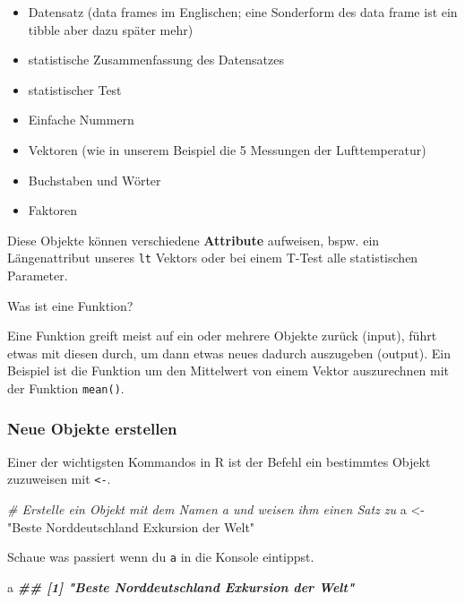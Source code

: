 \documentclass[
]{article}
\newenvironment{Shaded}{\begin{snugshade}}{\end{snugshade}}
\newcommand{\CommentTok}[1]{\textcolor[rgb]{0.56,0.35,0.01}{\textit{#1}}}
\newcommand{\DocumentationTok}[1]{\textcolor[rgb]{0.56,0.35,0.01}{\textbf{\textit{#1}}}}
\newcommand{\NormalTok}[1]{#1}
\newcommand{\OtherTok}[1]{\textcolor[rgb]{0.56,0.35,0.01}{#1}}
\newcommand{\StringTok}[1]{\textcolor[rgb]{0.31,0.60,0.02}{#1}}
\providecommand{\tightlist}{%
  \setlength{\itemsep}{0pt}\setlength{\parskip}{0pt}}
\begin{document}
\begin{itemize}
\tightlist
\item
  Datensatz (data frames im Englischen; eine Sonderform des data frame ist ein tibble aber dazu später mehr)
\item
  statistische Zusammenfassung des Datensatzes
\item
  statistischer Test
\item
  Einfache Nummern
\item
  Vektoren (wie in unserem Beispiel die 5 Messungen der Lufttemperatur)
\item
  Buchstaben und Wörter
\item
  Faktoren
\end{itemize}

Diese Objekte können verschiedene \textbf{Attribute} aufweisen, bspw. ein Längenattribut unseres \texttt{lt} Vektors oder bei einem T-Test alle statistischen Parameter.

Was ist eine Funktion?

Eine Funktion greift meist auf ein oder mehrere Objekte zurück (input), führt etwas mit diesen durch, um dann etwas neues dadurch auszugeben (output). Ein Beispiel ist die Funktion um den Mittelwert von einem Vektor auszurechnen mit der Funktion \texttt{mean()}.

\hypertarget{neue-objekte-erstellen}{%
\subsubsection{Neue Objekte erstellen}\label{neue-objekte-erstellen}}

Einer der wichtigsten Kommandos in R ist der Befehl ein bestimmtes Objekt zuzuweisen mit \texttt{\textless{}-}.

\begin{Shaded}
\begin{Highlighting}[]
\CommentTok{\# Erstelle ein Objekt mit dem Namen a und weisen ihm einen Satz zu}
\NormalTok{a }\OtherTok{\textless{}{-}} \StringTok{"Beste Norddeutschland Exkursion der Welt"}
\end{Highlighting}
\end{Shaded}

Schaue was passiert wenn du \texttt{a} in die Konsole eintippst.

\begin{Shaded}
\begin{Highlighting}[]
\NormalTok{a}
\DocumentationTok{\#\# [1] "Beste Norddeutschland Exkursion der Welt"}
\end{Highlighting}
\end{Shaded}
\end{document}
